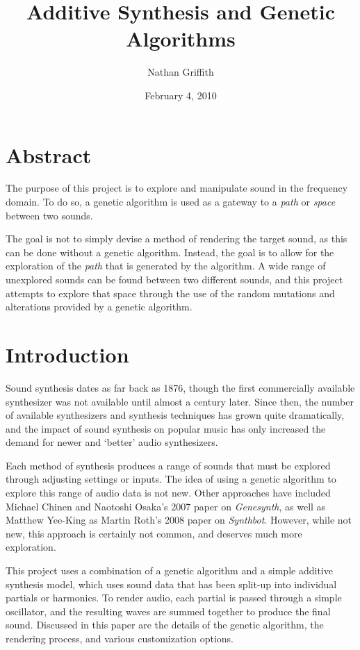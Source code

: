 \documentclass[11pt]{article}
\title{Additive Synthesis and Genetic Algorithms}
\author{Nathan  Griffith}
\date{February 4, 2010}
\begin{document}
\maketitle %

\section{Abstract}

The purpose of this project is to explore and manipulate sound in the frequency domain. To do so, a genetic algorithm is used as a gateway to a \emph{path} or \emph{space} between two sounds. 

The goal is not to simply devise a method of rendering the target sound, as this can be done without a genetic algorithm. Instead, the goal is to allow for the exploration of the \emph{path} that is generated by the algorithm. A wide range of unexplored sounds can be found between two different sounds, and this project attempts to explore that space through the use of the random mutations and alterations provided by a genetic algorithm. 

\section{Introduction}

Sound synthesis dates as far back as 1876, though the first commercially available synthesizer was not available until almost a century later. Since then, the number of available synthesizers and synthesis techniques has grown quite dramatically, and the impact of sound synthesis on popular music has only increased the demand for newer and `better' audio synthesizers.

Each method of synthesis produces a range of sounds that must be explored through adjusting settings or inputs. The idea of using a genetic algorithm to explore this range of audio data is not new. Other approaches have included Michael Chinen and Naotoshi Osaka's 2007 paper on \emph{Genesynth}\cite{genesynth}, as well as Matthew Yee-King as Martin Roth's 2008 paper on \emph{Synthbot}\cite{synthbot}. However, while not new, this approach is certainly not common, and deserves much more exploration.

This project uses a combination of a genetic algorithm and a simple additive synthesis model, which uses sound data that has been split-up into individual partials or harmonics. To render audio, each partial is passed through a simple oscillator, and the resulting waves are summed together to produce the final sound. Discussed in this paper are the details of the genetic algorithm, the rendering process, and various customization options.
\end{document}
